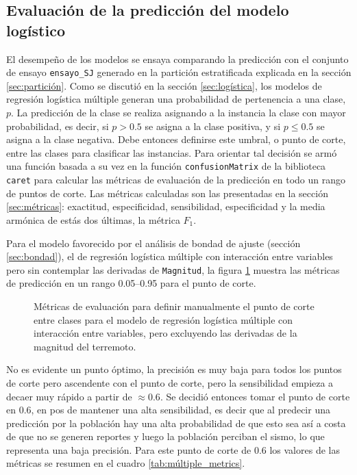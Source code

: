 \documentclass[a4paper]{report}
\begin{document}
\subsection{Evaluación de la predicción del modelo logístico}
El desempeño de los modelos se ensaya comparando la predicción con el conjunto de ensayo \verb'ensayo_SJ' generado en la partición estratificada explicada en la sección \ref{sec:partición}.
Como se discutió en la sección \ref{sec:logística}, los modelos de regresión logística múltiple generan una probabilidad de pertenencia a una clase, \(p\).
La predicción de la clase se realiza asignando a la instancia la clase con mayor probabilidad, es decir, si \(p > 0.5\) se asigna a la clase positiva, y si \(p \leq 0.5\) se asigna a la clase negativa. 
Debe entonces definirse este umbral, o punto de corte, entre las clases para clasificar las instancias.
Para orientar tal decisión se armó una función basada a su vez en la función \lstinline[language=R]{confusionMatrix} de la biblioteca \lstinline[language=R]{caret} para calcular las métricas de evaluación de la predicción en todo un rango de puntos de corte.
Las métricas calculadas son las presentadas en la sección \ref{sec:métricas}: exactitud, especificidad, sensibilidad, especificidad y la media armónica de estás dos últimas, la métrica \(F_1\).

Para el modelo favorecido por el análisis de bondad de ajuste (sección \ref{sec:bondad}), el de regresión logística múltiple con interacción entre variables pero sin contemplar las derivadas de \verb'Magnitud', la figura \ref{fig:múltiple_metrics} muestra las métricas de predicción en un rango \SIrange{0.05}{0.95}{} para el punto de corte.

\begin{figure}[!ht]
	\centering
	
	\vspace{-0.8cm}
	\caption{Métricas de evaluación para definir manualmente el punto de corte entre clases para el modelo de regresión logística múltiple con interacción entre variables, pero excluyendo las derivadas de la magnitud del terremoto.
	}
	\label{fig:múltiple_metrics}
\end{figure}

No es evidente un punto óptimo, la precisión es muy baja para todos los puntos de corte pero ascendente con el punto de corte, pero la sensibilidad empieza a decaer muy rápido a partir de \(\approx 0.6\).
Se decidió entonces tomar el punto de corte en \num{0.6}, en pos de mantener una alta sensibilidad, es decir que al predecir una predicción por la población hay una alta probabilidad de que esto sea así a costa de que no se generen reportes y luego la población perciban el sismo, lo que representa una baja precisión.
Para este punto de corte de \num{0.6} los valores de las métricas se resumen en el cuadro \ref{tab:múltiple_metrics}.
\end{document}
